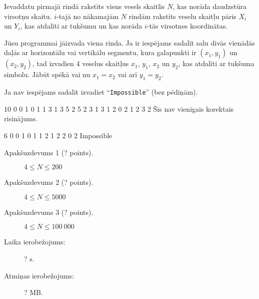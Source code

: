 \documentclass{boi2014-lv}
\newcommand{\constant}[1]{{\tt #1}}
\begin{document}
    \Input
		
		Ievaddatu pirmajā rindā rakstīts viens vesels skaitlis $N$, kas norāda daudzstūra virsotņu skaitu. $i$-tajā no nākamajām $N$ rindām rakstīts veselu skaitļu pāris $X_i$ un $Y_i$, kas atdalīti ar tukšumu un kas norāda $i$-tās virsotnes koordinātas.

	\Output
	
		Jūsu programmai jāizvada viena rinda. Ja ir iespējams sadalīt salu divās vienādās daļās ar horizontālu vai vertikālu segmentu, kura galapunkti ir $(x_1, y_1)$ un $(x_2, y_2)$, tad izvadien 4 veselus skaitļus $x_1$, $y_1$, $x_2$ un $y_2$, kas atdalīti ar tukšuma simbolu. Jābūt spēkā vai nu $x_1 = x_2$ vai arī $y_1 = y_2$.

	Ja nav iespējams sadalīt izvadiet	``\constant{Impossible}'' (bez pēdiņām).

    \Examples
	\example
	{
		10
		0 0
		1 0
		1 1
		3 1
		3 5
		2 5
		2 3
		1 3
		1 2
		0 2
	}
	{
		1 2 3 2
	}
	{
		Šis nav vienīgais korektais risinājums.
	}

	\example
	{
		6
		0 0
		1 0
		1 1
		2 1
		2 2
		0 2
	}
	{
		Impossible
	}

    \Scoring

    \begin{description}
        \item[Apakšuzdevums 1 (? points).] $4 \le N \le 200$
        \item[Apakšuzdevums 2 (? points).] $4 \le N \le 5000$
        \item[Apakšuzdevums 3 (? points).] $4 \le N \le 100\ 000$
    \end{description}

    \Constraints

    \begin{description}
        \item[Laika ierobežojums:] ? s.
        \item[Atmiņas ierobežojums:] ? MB.
    \end{description}
\end{document}
